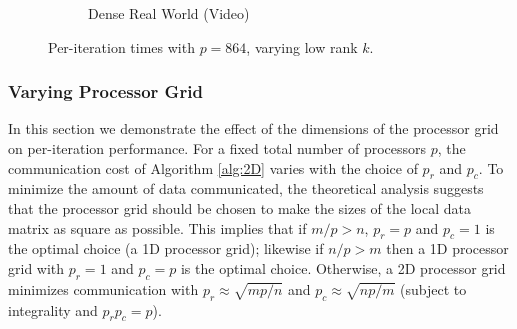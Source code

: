 \begin{figure}

\naivetrue
\ksweeptrue
\legendtrue

\begin{subfigure}{\columnwidth}
\renewcommand{\datafile}{data/sparsesyn864_ksweep_scale_pgf.dat}
\label{fig:sparsesynksweep}
\end{subfigure}
\legendfalse

\begin{subfigure}{\columnwidth}
\renewcommand{\datafile}{data/densesyn864_ksweep_scale_pgf.dat}
\label{fig:densesynksweep}
\end{subfigure}


\begin{subfigure}{\columnwidth}
\renewcommand{\datafile}{data/sparserwksweep_scale_pgf.dat}
\label{fig:sparserwksweep}
\end{subfigure}

\begin{subfigure}{\columnwidth}
\renewcommand{\datafile}{data/denserw_ksweep_scale_pgf.dat}
\caption{Dense Real World (Video)}
\label{fig:denserwksweep}
\end{subfigure}

\caption{Per-iteration times with $p=864$, varying low rank $k$.}
\label{fig:ksweep}
\end{figure}

\subsubsection{Varying Processor Grid}
\label{sec:procgrid}

In this section we demonstrate the effect of the dimensions of the processor grid on per-iteration performance.
For a fixed total number of processors $p$, the communication cost of Algorithm \ref{alg:2D} varies with the choice of $p_r$ and $p_c$.
To minimize the amount of data communicated, the theoretical analysis suggests that the processor grid should be chosen to make the sizes of the local data matrix as square as possible.
This implies that if $m/p > n$, $p_r=p$ and $p_c=1$ is the optimal choice (a 1D processor grid); likewise if $n/p > m$ then a 1D processor grid with $p_r=1$ and $p_c=p$ is the optimal choice.
Otherwise, a 2D processor grid minimizes communication with $p_r \approx \sqrt{mp/n}$ and $p_c \approx \sqrt{np/m}$ (subject to integrality and $p_rp_c=p$).

